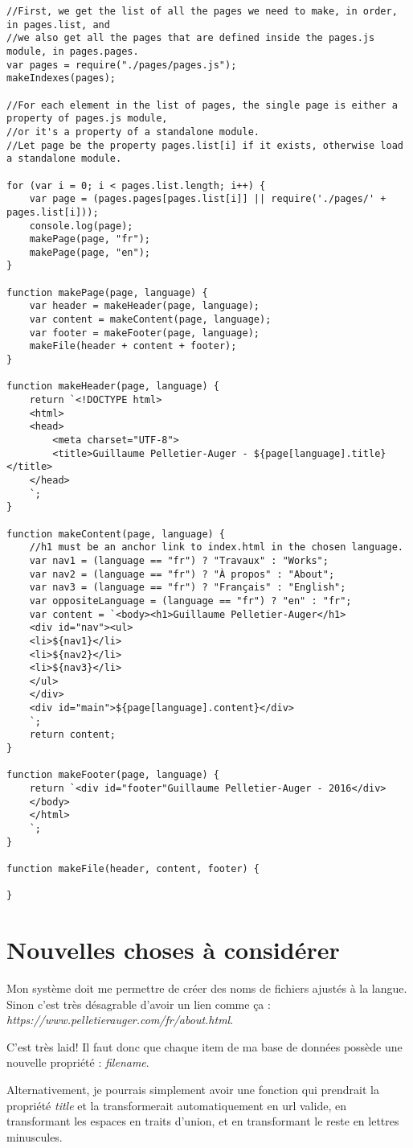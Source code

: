 \begin{lstlisting}
//First, we get the list of all the pages we need to make, in order, in pages.list, and
//we also get all the pages that are defined inside the pages.js module, in pages.pages.
var pages = require("./pages/pages.js");
makeIndexes(pages);

//For each element in the list of pages, the single page is either a property of pages.js module,
//or it's a property of a standalone module.
//Let page be the property pages.list[i] if it exists, otherwise load a standalone module.

for (var i = 0; i < pages.list.length; i++) {
    var page = (pages.pages[pages.list[i]] || require('./pages/' + pages.list[i]));
    console.log(page);
    makePage(page, "fr");
    makePage(page, "en");
}

function makePage(page, language) {
    var header = makeHeader(page, language);
    var content = makeContent(page, language);
    var footer = makeFooter(page, language);
    makeFile(header + content + footer);
}

function makeHeader(page, language) {
    return `<!DOCTYPE html>
    <html>
    <head>
        <meta charset="UTF-8">
        <title>Guillaume Pelletier-Auger - ${page[language].title}</title>
    </head>
    `;
}

function makeContent(page, language) {
    //h1 must be an anchor link to index.html in the chosen language.
    var nav1 = (language == "fr") ? "Travaux" : "Works";
    var nav2 = (language == "fr") ? "À propos" : "About";
    var nav3 = (language == "fr") ? "Français" : "English";
    var oppositeLanguage = (language == "fr") ? "en" : "fr";
    var content = `<body><h1>Guillaume Pelletier-Auger</h1>
    <div id="nav"><ul>
    <li>${nav1}</li>
    <li>${nav2}</li>
    <li>${nav3}</li>
    </ul>
    </div>
    <div id="main">${page[language].content}</div>
    `;
    return content;
}

function makeFooter(page, language) {
    return `<div id="footer"Guillaume Pelletier-Auger - 2016</div>
    </body>
    </html>
    `;
}

function makeFile(header, content, footer) {

}

\end{lstlisting}

\section{Nouvelles choses à considérer}
Mon système doit me permettre de créer des noms de fichiers ajustés à la langue. Sinon c'est très désagrable d'avoir un lien comme ça : \textit{https://www.pelletierauger.com/fr/about.html}.

C'est très laid! Il faut donc que chaque item de ma base de données possède une nouvelle propriété : \textit{filename}.

Alternativement, je pourrais simplement avoir une fonction qui prendrait la propriété \textit{title} et la transformerait automatiquement en url valide, en transformant les espaces en traits d'union, et en transformant le reste en lettres minuscules. 
